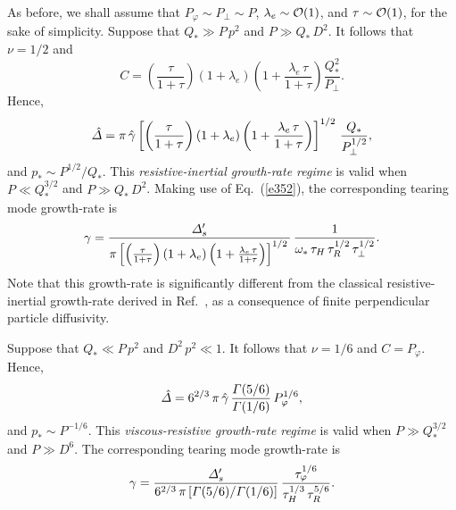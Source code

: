 \documentclass[12pt,prb,aps]{revtex4-1}
\begin{document}
As before, we shall assume that $P_\varphi\sim P_\perp \sim P$, $\lambda_e\sim{\cal O}(1)$, and $\tau\sim {\cal O}(1)$, for
the sake of simplicity. 
Suppose that $Q_\ast\gg P\,p^2$ and $P\gg Q_\ast\,D^2$. It follows that $\nu=1/2$ and
\begin{equation}
C =\left(\frac{\tau}{1+\tau}\right) (1+\lambda_e)\left(1+\frac{\lambda_e\,\tau}{1+\tau}\right)\frac{Q_\ast^{2}}{P_\perp}.
\end{equation}
Hence, 
\begin{equation}
\hat{\mit\Delta} = \pi\,\hat{\gamma}\left[ \left(\frac{\tau}{1+\tau}\right)(1+\lambda_e)\left(1+\frac{\lambda_e\,\tau}{1+\tau}\right)\right]^{1/2}\,\frac{Q_\ast}{P_\perp^{1/2}},
\end{equation}
and $p_\ast\sim P^{1/2}/Q_\ast$. This {\em resistive-inertial  growth-rate regime}\/ is valid when $P\ll Q_\ast^{3/2}$ and
$P\gg Q_\ast\,D^2$. 
Making use of Eq.~(\ref{e352}), the corresponding tearing mode growth-rate is
\begin{equation}\label{e363}
\gamma = \frac{{\mit\Delta}_s'}{\pi\left[ \left(\frac{\tau}{1+\tau}\right)(1+\lambda_e)\left(1+\frac{\lambda_e\,\tau}{1+\tau}\right)\right]^{1/2}\,}\,\frac{1}{\omega_\ast\,\tau_H\,\tau_R^{1/2}\,\tau_\perp^{1/2}}.
\end{equation}
Note that this growth-rate is significantly different from 
the classical resistive-inertial growth-rate derived in Ref.~,  as a consequence of finite perpendicular particle diffusivity. 

Suppose that $Q_\ast \ll P\,p^2$ and $D^2\,p^2\ll 1$. 
It follows that $\nu=1/6$ and
$C = P_\varphi$. 
Hence, 
\begin{equation}
\hat{\mit\Delta} = 6^{2/3}\,\pi\,\hat{\gamma}\, \frac{{\mit\Gamma}(5/6)}{{\mit\Gamma}(1/6)}\,P_\varphi^{1/6}, 
\end{equation}
and $p_\ast\sim P^{-1/6}$. This  {\em viscous-resistive growth-rate regime}\/ is valid when $P\gg Q_\ast^{3/2}$ and
$P\gg D^6$. 
The corresponding tearing mode growth-rate is
\begin{equation}\label{e365}
\gamma = \frac{{\mit\Delta}_s'}{6^{2/3}\,\pi\,[{\mit\Gamma}(5/6)/{\mit\Gamma}(1/6)]}\,\frac{\tau_\varphi^{1/6}}{\tau_H^{1/3}\,\tau_R^{5/6}}.
\end{equation}
\end{document}
